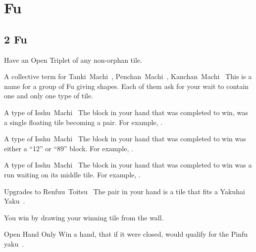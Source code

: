 \section{Fu}\label{core:sec:fu}

\subsection{2 Fu}\label{core:ssec:2-fu}

	{}
	{Have an Open Triplet of any non-orphan tile. }

	{\upgradesto A collective term for Tanki~Machi~, Penchan~Machi~, Kanchan~Machi~}
	{This is a name for a group of Fu giving shapes. Each of them ask for your wait to contain one and only one type of tile.}

	{\upgradesfrom A type of Isshu~Machi~}
	{The block in your hand that was completed to win, was a single floating tile becoming a pair. For example, .}

	{\upgradesfrom A type of Isshu~Machi~}
	{The block in your hand that was completed to win was either a ``12'' or ``89'' block. For example, .}

	{\upgradesfrom A type of Isshu~Machi~}
	{The block in your hand that was completed to win was a run waiting on its middle tile. For example, .}

	{\upgradesto Upgrades to Renfuu~Toitsu~}
	{The pair in your hand is a tile that fits a Yakuhai Yaku~.}

	{}
	{You win by drawing your winning tile from the wall.}

	{\symbalert Open Hand Only}
	{Win a hand, that if it were closed, would qualify for the Pinfu yaku~.}


